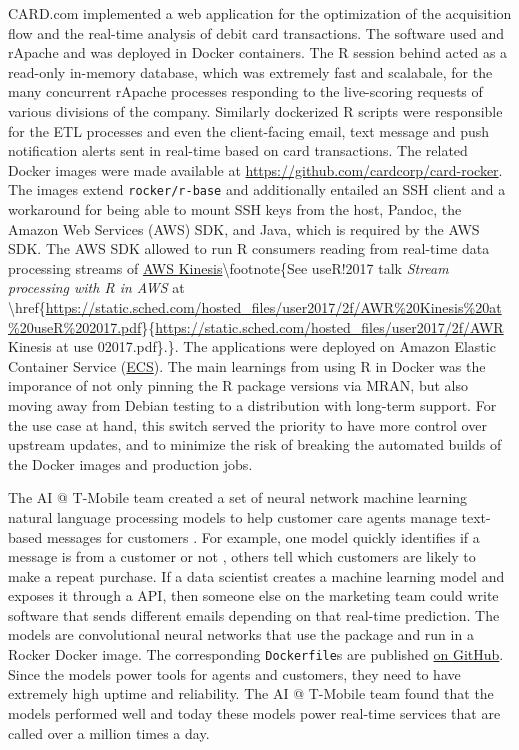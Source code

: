 CARD.com implemented a web application for the optimization of the
acquisition flow and the real-time analysis of debit card transactions.
The software used  and rApache and was deployed in
Docker containers. The R session behind  acted as a
read-only in-memory database, which was extremely fast and scalabale,
for the many concurrent rApache processes responding to the live-scoring
requests of various divisions of the company. Similarly dockerized R
scripts were responsible for the ETL processes and even the
client-facing email, text message and push notification alerts sent in
real-time based on card transactions. The related Docker images were
made available at \url{https://github.com/cardcorp/card-rocker}. The
images extend \texttt{rocker/r-base} and additionally entailed an SSH
client and a workaround for being able to mount SSH keys from the host,
Pandoc, the Amazon Web Services (AWS) SDK, and Java, which is required
by the AWS SDK. The AWS SDK allowed to run R consumers reading from
real-time data processing streams of
\href{https://aws.amazon.com/kinesis/}{AWS
Kinesis}\textbackslash{}footnote\{See useR!2017 talk \emph{Stream
processing with R in AWS} at
\textbackslash{}href\{\url{https://static.sched.com/hosted_files/user2017/2f/AWR\%20Kinesis\%20at\%20useR\%202017.pdf}\}\{\url{https://static.sched.com/hosted_files/user2017/2f/AWR}
Kinesis at use 02017.pdf\}.\}. The applications were deployed on Amazon
Elastic Container Service (\href{https://aws.amazon.com/ecs/}{ECS}). The
main learnings from using R in Docker was the imporance of not only
pinning the R package versions via MRAN, but also moving away from
Debian testing to a distribution with long-term support. For the use
case at hand, this switch served the priority to have more control over
upstream updates, and to minimize the risk of breaking the automated
builds of the Docker images and production jobs.

The AI @ T-Mobile team created a set of neural network machine learning
natural language processing models to help customer care agents manage
text-based messages for customers \citep{t-mobile_enterprise_2018}. For
example, one model quickly identifies if a message is from a customer or
not
\citep[see -based \href{https://secure.message.t-mobile.com/v1/shiny/is-customer/app/}{demo}, ][]{nolis_small_2019},
others tell which customers are likely to make a repeat purchase. If a
data scientist creates a machine learning model and exposes it through a
 API, then someone else on the marketing team could
write software that sends different emails depending on that real-time
prediction. The models are convolutional neural networks that use the
 package and run in a Rocker Docker image. The
corresponding \texttt{Dockerfile}s are published
\href{https://github.com/tmobile/r-tensorflow-api}{on GitHub}. Since the
models power tools for agents and customers, they need to have extremely
high uptime and reliability. The AI @ T-Mobile team found that the
models performed well and today these models power real-time services
that are called over a million times a day.

